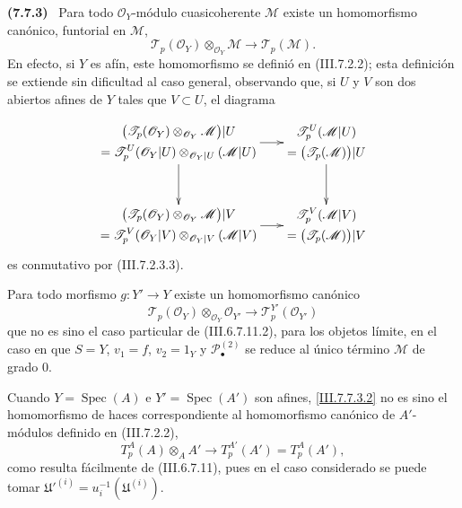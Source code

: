 \documentclass[10pt,oneside]{book}
\newcommand{\sref}[2][]{\textup{(#2)}}
\newcommand{\oldpage}[2][]{\setcounter{footnote}{0}\marginpar{\scriptsize\textbf{#1}~|~#2}\ignorespaces}
\newenvironment{env}[1][]{\par\medskip\noindent\textbf{(#1)}\ }{\par}
\begin{document}
\begin{env}[7.7.3]
\label{III.7.7.3}
Para todo $\mathscr O_Y$-módulo cuasicoherente $\mathscr M$ existe un
homomorfismo canónico, funtorial en $\mathscr M$,
\[
  \mathscr T_p(\mathscr O_Y)\otimes_{\mathscr O_Y}\mathscr M
  \longrightarrow
  \mathscr T_p(\mathscr M).
  \tag{7.7.3.1}\label{III.7.7.3.1}
\]
En efecto, si $Y$ es afín, este homomorfismo se definió en
\sref{III.7.2.2}; esta definición se extiende sin dificultad al caso general,
observando que, si $U$ y $V$ son dos abiertos afines de $Y$ tales que
$V\subset U$, el diagrama

\oldpage[III]{199}
\[
\xymatrix@C=18pt@R=32pt{
  {\begin{gathered}
    \bigl(\mathscr T_p(\mathscr O_Y)
      \otimes_{\mathscr O_Y}\mathscr M\bigr)|U\\
    =\mathscr T^U_p(\mathscr O_Y|U)
      \otimes_{\mathscr O_Y|U}(\mathscr M|U)
  \end{gathered}}
  \ar[r]\ar[d]
  &
  {\begin{gathered}
    \mathscr T^U_p(\mathscr M|U)\\
    =\bigl(\mathscr T_p(\mathscr M)\bigr)|U
  \end{gathered}}
  \ar[d]
  \\
  {\begin{gathered}
    \bigl(\mathscr T_p(\mathscr O_Y)
      \otimes_{\mathscr O_Y}\mathscr M\bigr)|V\\
    =\mathscr T^V_p(\mathscr O_Y|V)
      \otimes_{\mathscr O_Y|V}(\mathscr M|V)
  \end{gathered}}
  \ar[r]
  &
  {\begin{gathered}
    \mathscr T^V_p(\mathscr M|V)\\
    =\bigl(\mathscr T_p(\mathscr M)\bigr)|V
  \end{gathered}}
}
\]
es conmutativo por \sref{III.7.2.3.3}.

Para todo morfismo $g:Y'\to Y$ existe un homomorfismo canónico
\[
  \mathscr T_p(\mathscr O_Y)\otimes_{\mathscr O_Y}\mathscr O_{Y'}
  \longrightarrow
  \mathscr T^{Y'}_p(\mathscr O_{Y'})
  \tag{7.7.3.2}\label{III.7.7.3.2}
\]
que no es sino el caso particular de \sref{III.6.7.11.2}, para los objetos
límite, en el caso en que $S=Y$, $v_1=f$, $v_2=1_Y$ y
$\mathscr P^{(2)}_\bullet$ se reduce al único término $\mathscr M$ de grado
$0$.

Cuando $Y=\operatorname{Spec}(A)$ e $Y'=\operatorname{Spec}(A')$ son afines,
\eqref{III.7.7.3.2} no es sino el homomorfismo de haces correspondiente al
homomorfismo canónico de $A'$-módulos definido en \sref{III.7.2.2},
\[
  T^A_p(A)\otimes_A A'
  \longrightarrow
  T^{A'}_p(A')=T^A_p(A'),
\]
como resulta fácilmente de \sref{III.6.7.11}, pues en el caso considerado se
puede tomar $\mathfrak U'^{(i)}=u_i^{-1}(\mathfrak U^{(i)})$.
\end{env}
\end{document}
